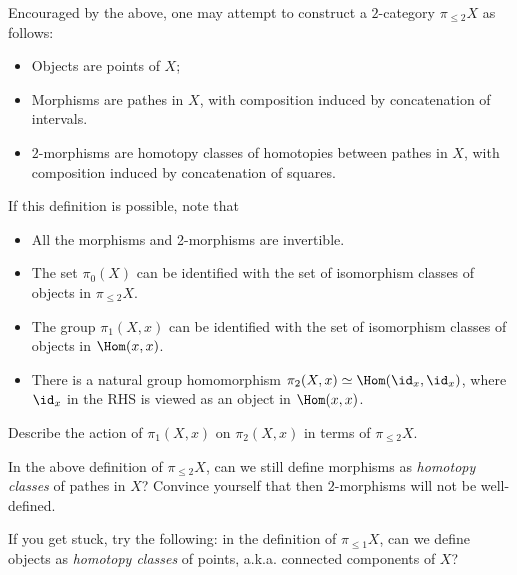 Encouraged by the above, one may attempt to construct a $2$-category $\pi_{\le 2}X$ as follows:
\begin{itemize}
	\item 
		Objects are points of $X$;
	\item
		Morphisms are pathes in $X$, with composition induced by concatenation of intervals.
	\item
		$2$-morphisms are homotopy classes of homotopies between pathes in $X$, with composition induced by concatenation of squares.
\end{itemize}
If this definition is possible, note that
\begin{itemize}
	\item 
		All the morphisms and 2-morphisms are invertible.
	\item
		The set $\pi_0(X)$ can be identified with the set of isomorphism classes of objects in $\pi_{\le 2}X$.
	\item
		The group $\pi_1(X,x)$ can be identified with the set of isomorphism classes of objects in $\Hom(x,x)$.
	\item
		There is a natural group homomorphism $\pi_2(X,x) \simeq \Hom(\id_x,\id_x)$, where $\id_x$ in the RHS is viewed as an object in $\Hom(x,x)$.

\end{itemize}

\begin{exe}
	Describe the action of $\pi_1(X,x)$ on $\pi_2(X,x)$ in terms of $\pi_{\le 2}X$.
\end{exe}

\begin{exe}
	\label{exe-why-not-modulo-homotopy?}
	In the above definition of $\pi_{\le 2}X$, can we still define morphisms as \emph{homotopy classes} of pathes in $X$? Convince yourself that then $2$-morphisms will not be well-defined.

	If you get stuck, try the following: in the definition of $\pi_{\le 1}X$, can we define objects as \emph{homotopy classes} of points, a.k.a. connected components of $X$?
\end{exe}



\ssec{}
	
